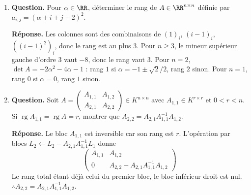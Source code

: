 \documentclass[12pt, a4paper]{article}
\begin{document}
\begin{enumerate}[label=6.\arabic*., start=105]
  \item \begin{minipage}[t]{\linewidth}\raggedright
\textbf{Question.} Pour $\alpha\in\RR$, déterminer le rang de $A\in\RR^{n\times n}$ définie par $a_{i,j}=(\alpha+i+j-2)^2$.
\par\smallskip
\textbf{Réponse.} Les colonnes sont des combinaisons de $(1)_i$, $(i-1)_i$, $((i-1)^2)_i$, donc le rang est au plus $3$.
    Pour $n\geq3$, le mineur supérieur gauche d'ordre $3$ vaut $-8$, donc le rang vaut $3$.
    Pour $n=2$, $\det A=-2\alpha^2-4\alpha-1$ : rang $1$ si $\alpha=-1\pm\sqrt2/2$, rang $2$ sinon.
    Pour $n=1$, rang $0$ si $\alpha=0$, rang $1$ sinon.
\end{minipage}

  \item \begin{minipage}[t]{\linewidth}\raggedright
\textbf{Question.} Soit $A=\begin{pmatrix}A_{1,1}&A_{1,2}\\A_{2,1}&A_{2,2}\end{pmatrix}\in K^{n\times n}$ avec $A_{1,1}\in K^{r\times r}$ et $0<r<n$. Si $\operatorname{rg}A_{1,1}=\operatorname{rg}A=r$, montrer que $A_{2,2}=A_{2,1}A_{1,1}^{-1}A_{1,2}$.
\par\smallskip
\textbf{Réponse.} Le bloc $A_{1,1}$ est inversible car son rang est $r$.
    L'opération par blocs $L_2\leftarrow L_2-A_{2,1}A_{1,1}^{-1}L_1$ donne
    \[
      \begin{pmatrix}A_{1,1}&A_{1,2}\\0&A_{2,2}-A_{2,1}A_{1,1}^{-1}A_{1,2}\end{pmatrix}
    \]
    Le rang total étant déjà celui du premier bloc, le bloc inférieur droit est nul.
    $\therefore A_{2,2}=A_{2,1}A_{1,1}^{-1}A_{1,2}$.
\end{minipage}

\end{enumerate}
\end{document}
